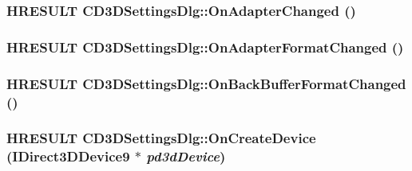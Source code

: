 \label{class_c_d3_d_settings_dlg_a8a3ecd505c89b0bba30aabce63534a31}
\hypertarget{class_c_d3_d_settings_dlg_a16315666d38d33b8d6b6b896f854eb42}{
\subsubsection[{OnAdapterChanged}]{\setlength{\rightskip}{0pt plus 5cm}HRESULT CD3DSettingsDlg::OnAdapterChanged ()}}
\label{class_c_d3_d_settings_dlg_a16315666d38d33b8d6b6b896f854eb42}
\hypertarget{class_c_d3_d_settings_dlg_a422dec4deed87610ff75783dceb2b4b8}{
\subsubsection[{OnAdapterFormatChanged}]{\setlength{\rightskip}{0pt plus 5cm}HRESULT CD3DSettingsDlg::OnAdapterFormatChanged ()}}
\label{class_c_d3_d_settings_dlg_a422dec4deed87610ff75783dceb2b4b8}
\hypertarget{class_c_d3_d_settings_dlg_a2ec3c8e1d0fb192aa5448c4ac8f138b2}{
\subsubsection[{OnBackBufferFormatChanged}]{\setlength{\rightskip}{0pt plus 5cm}HRESULT CD3DSettingsDlg::OnBackBufferFormatChanged ()}}
\label{class_c_d3_d_settings_dlg_a2ec3c8e1d0fb192aa5448c4ac8f138b2}
\hypertarget{class_c_d3_d_settings_dlg_afc71a070eaf9072f4dc3253aac1baddf}{
\subsubsection[{OnCreateDevice}]{\setlength{\rightskip}{0pt plus 5cm}HRESULT CD3DSettingsDlg::OnCreateDevice (IDirect3DDevice9 $\ast$ {\em pd3dDevice})}}
